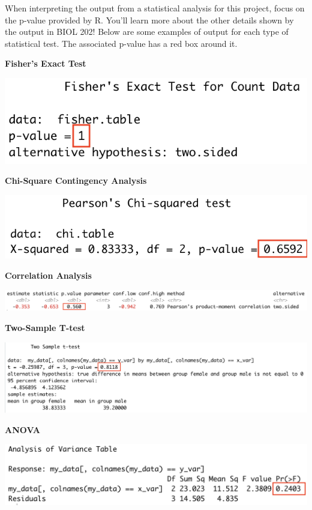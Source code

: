 \documentclass[
]{book}
\begin{document}
When interpreting the output from a statistical analysis for this project, focus on the p-value provided by R. You'll learn more about the other details shown by the output in BIOL 202! Below are some examples of output for each type of statistical test. The associated p-value has a red box around it.

\textbf{Fisher's Exact Test}

\includegraphics{images/fishers_example.png}

\textbf{Chi-Square Contingency Analysis}

\includegraphics{images/chi-square_example.png}

\textbf{Correlation Analysis}

\includegraphics{images/correlation_example.png}

\textbf{Two-Sample T-test}

\includegraphics{images/t-test_example.png}

\textbf{ANOVA}

\includegraphics{images/anova_example.png}
\end{document}
